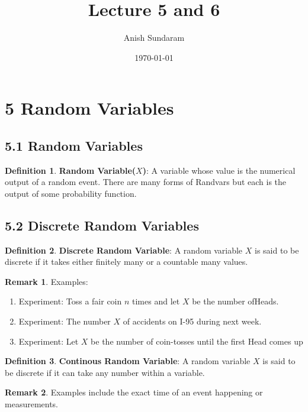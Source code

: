 \documentclass[12pt]{amsart}
\title{Lecture 5 and 6}
\author{Anish Sundaram}
\date{\today}
\theoremstyle{definition}
\newtheorem{definition}{Definition} %
\newtheorem*{remark}{Remark}        %
\numberwithin{equation}{theorem}    %
\begin{document}
\maketitle

\tableofcontents

\section*{5 Random Variables}
\subsection*{5.1 Random Variables}

\begin{definition}
    \textbf{Random Variable($X$)}:
    A variable whose value is the numerical output of a random event.
    There are many forms of Randvars but each is the output of some probability function. 
\end{definition}

\subsection*{5.2 Discrete Random Variables}

\begin{definition}
    \textbf{Discrete Random Variable}:
    A random variable $X$ is said to be discrete if it takes either finitely many or a countable many values.
    \begin{remark}
        Examples: \begin{enumerate}
            \item Experiment: Toss a fair coin $n$ times and let $X$ be the number ofHeads.
            \item Experiment: The number $X$ of accidents on I-95 during next week.
            \item Experiment: Let $X$ be the number of coin-tosses until the first Head comes up
        \end{enumerate}  
    \end{remark}
\end{definition}


\begin{definition}
    \textbf{Continous Random Variable}:
    A random variable $X$ is said to be discrete if it can take any number within a variable.
    \begin{remark}
        Examples include the exact time of an event happening or measurements.
    \end{remark}
\end{definition}
\end{document}
